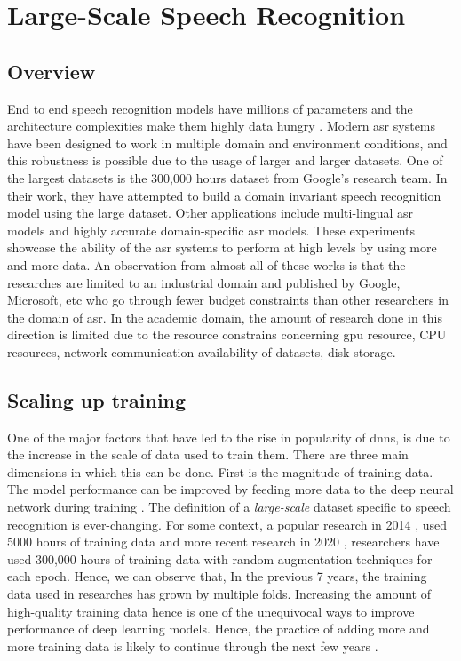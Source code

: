 \chapter{Large-Scale Speech Recognition}
\label{chapter:largescale}

\section{Overview}
End to end speech recognition models have millions of parameters and the architecture complexities make them highly data hungry \cite{Li2020OnRecognition}. Modern \acrshort{asr} systems have been designed to work in multiple domain and environment conditions, and this robustness is possible due to the usage of larger and larger datasets. One of the largest datasets is the 300,000 hours dataset from Google's research team. In their work, they have attempted to build a domain invariant speech recognition model using the large dataset\cite{Narayanan2019TowardTraining}. Other applications include multi-lingual \acrshort{asr} models \cite{Kannan2019Large-ScaleModel} and highly accurate domain-specific \acrshort{asr} models. These experiments showcase the ability of the \acrshort{asr} systems to perform at high levels by using more and more data. An observation from almost all of these works is that the researches are limited to an industrial domain and published by Google, Microsoft, etc who go through fewer budget constraints than other researchers in the domain of \acrshort{asr}. In the academic domain, the amount of research done in this direction is limited due to the resource constrains concerning \acrshort{gpu} resource, CPU resources, network communication availability of datasets, disk storage. 

\section{Scaling up training}
One of the major factors that have led to the rise in popularity of \acrshort{dnn}s, is due to the increase in the scale of data used to train them. There are three main dimensions in which this can be done. First is the magnitude of training data. The model performance can be improved by feeding more data to the deep neural network during training \cite{Hestness2017DEEPEMPIRICALLY}. The definition of a \emph{large-scale} dataset specific to speech recognition is ever-changing. For some context, a popular research in 2014 \cite{Hannun2014DeepRecognition}, used 5000 hours of training data and more recent research in 2020 \cite{Narayanan2019RECOGNIZINGMODELS}, researchers have used 300,000 hours of training data with random augmentation techniques for each epoch. Hence, we can observe that, In the previous 7 years, the training data used in researches has grown by multiple folds. Increasing the amount of high-quality training data hence is one of the unequivocal ways to improve performance of deep learning models. Hence, the practice of adding more and more training data is likely to continue through the next few years \cite{Mayer2020ScalableInfrastructures}. 


